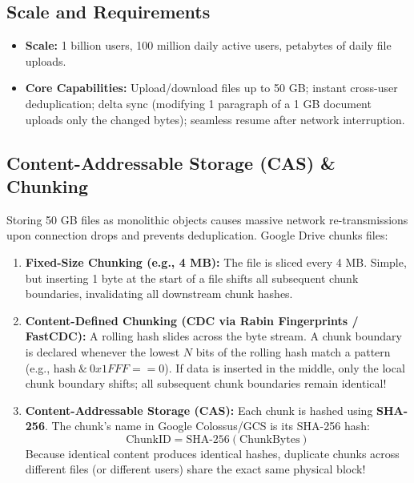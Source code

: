 \documentclass[10pt,journal,compsoc,onecolumn]{IEEEtran}
\begin{document}
\subsection{Scale and Requirements}
\begin{itemize}
    \item \textbf{Scale:} 1 billion users, 100 million daily active users, petabytes of daily file uploads.
    \item \textbf{Core Capabilities:} Upload/download files up to 50 GB; instant cross-user deduplication; delta sync (modifying 1 paragraph of a 1 GB document uploads only the changed bytes); seamless resume after network interruption.
\end{itemize}

\subsection{Content-Addressable Storage (CAS) \& Chunking}
Storing 50 GB files as monolithic objects causes massive network re-transmissions upon connection drops and prevents deduplication. Google Drive chunks files:

\begin{enumerate}
    \item \textbf{Fixed-Size Chunking (e.g., 4 MB):} The file is sliced every 4 MB. Simple, but inserting 1 byte at the start of a file shifts all subsequent chunk boundaries, invalidating all downstream chunk hashes.
    \item \textbf{Content-Defined Chunking (CDC via Rabin Fingerprints / FastCDC):} A rolling hash slides across the byte stream. A chunk boundary is declared whenever the lowest $N$ bits of the rolling hash match a pattern (e.g., $\text{hash} \ \& \ 0x1FFF == 0$). If data is inserted in the middle, only the local chunk boundary shifts; all subsequent chunk boundaries remain identical!
    \item \textbf{Content-Addressable Storage (CAS):} Each chunk is hashed using \textbf{SHA-256}. The chunk's name in Google Colossus/GCS is its SHA-256 hash:
    \begin{equation}
        \text{ChunkID} = \text{SHA-256}(\text{ChunkBytes})
    \end{equation}
    Because identical content produces identical hashes, duplicate chunks across different files (or different users) share the exact same physical block!
\end{enumerate}
\end{document}
